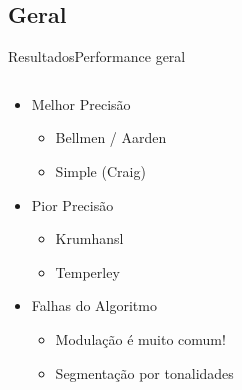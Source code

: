 \subsection{Geral}
\begin{frame}{Resultados}{Performance geral}{}
    \begin{columns}[T]
         \begin{column}{.3\textwidth}
            \begin{itemize}
                \item Melhor Precisão
                \begin{itemize}
                    \item Bellmen / Aarden
                    \item Simple (Craig)
                \end{itemize}
                \item Pior Precisão
                \begin{itemize}
                    \item Krumhansl
                    \item Temperley
                \end{itemize}
                \item Falhas do Algoritmo
                \begin{itemize}
                    \item Modulação é muito comum!
                    \item Segmentação por tonalidades
                \end{itemize}
            \end{itemize}
         \end{column}
         \begin{column}{.7\textwidth}
            \begin{center}
            \end{center}
         \end{column}
     \end{columns}

\end{frame}

